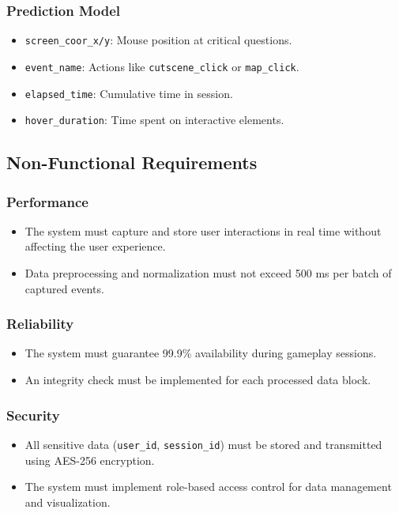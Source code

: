 \documentclass{article}
\newcommand{\reqnum}[1]{\textbf{\underline{RF-#1}}}
\newcommand{\reqnumNF}[1]{\textbf{\underline{RNF-#1}}}
\begin{document}
\subsubsection{Prediction Model}
\begin{itemize}
    \item[\reqnum{011}] \texttt{screen\_coor\_x/y}: Mouse position at critical questions.
    \item[\reqnum{012}] \texttt{event\_name}: Actions like \texttt{cutscene\_click} or \texttt{map\_click}.
    \item[\reqnum{013}] \texttt{elapsed\_time}: Cumulative time in session.
    \item[\reqnum{014}] \texttt{hover\_duration}: Time spent on interactive elements.
\end{itemize}

\subsection{Non-Functional Requirements}
\subsubsection{Performance}
\begin{itemize}
    \item[\reqnumNF{001}] The system must capture and store user interactions in real time without affecting the user experience.
    \item[\reqnumNF{002}] Data preprocessing and normalization must not exceed 500 ms per batch of captured events.
\end{itemize}

\subsubsection{Reliability}
\begin{itemize}
    \item[\reqnumNF{003}] The system must guarantee 99.9\% availability during gameplay sessions.
    \item[\reqnumNF{004}] An integrity check must be implemented for each processed data block.
\end{itemize}

\subsubsection{Security}
\begin{itemize}
    \item[\reqnumNF{005}] All sensitive data (\texttt{user\_id}, \texttt{session\_id}) must be stored and transmitted using AES-256 encryption.
    \item[\reqnumNF{006}] The system must implement role-based access control for data management and visualization.
\end{itemize}
\end{document}
